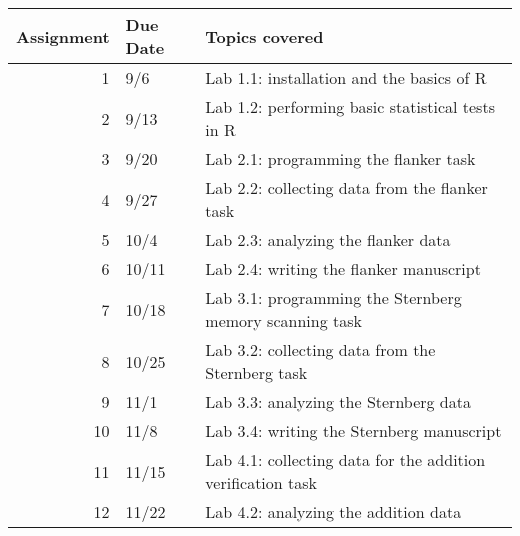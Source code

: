 \documentclass[10pt]{article}
\begin{document}
\begin{center}
\begin{tabular}{rll}
Assignment & Due Date & Topics covered\\
\hline
1 & 9/6 & Lab 1.1: installation and the basics of R\\
2 & 9/13 & Lab 1.2: performing basic statistical tests in R\\
3 & 9/20 & Lab 2.1: programming the flanker task\\
4 & 9/27 & Lab 2.2: collecting data from the flanker task\\
5 & 10/4 & Lab 2.3: analyzing the flanker data\\
6 & 10/11 & Lab 2.4: writing the flanker manuscript\\
7 & 10/18 & Lab 3.1: programming the Sternberg memory scanning task\\
8 & 10/25 & Lab 3.2: collecting data from the Sternberg task\\
9 & 11/1 & Lab 3.3: analyzing the Sternberg data\\
10 & 11/8 & Lab 3.4: writing the Sternberg manuscript\\
11 & 11/15 & Lab 4.1: collecting data for the addition verification task\\
12 & 11/22 & Lab 4.2: analyzing the addition data\\
\end{tabular}
\end{center}
\end{document}
